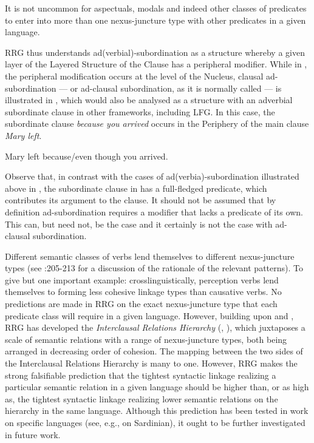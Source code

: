 \documentclass[output=paper,hidelinks]{langscibook}
\begin{document}
It is not uncommon for aspectuals, modals and indeed other classes of predicates to enter into more than one nexus-juncture type with other predicates in a given language.

\hspace*{-3pt}RRG thus understands ad(verbial)-subordination as a structure whereby a given layer of the Layered Structure of the Clause has a peripheral modifier. While in , the peripheral modification occurs at the level of the Nucleus, clausal ad-subordination --- or ad-clausal subordination, as it is normally called --- is illustrated in , which would also be analysed as a structure with an adverbial subordinate clause in other frameworks, including LFG. In this case, the subordinate clause \textit{because you arrived} occurs in the Periphery of the main clause \textit{Mary left}.

\ea%
   \label{ex:RRG:43}
   Mary left because/even though you arrived.
   \z

      

  Observe that, in contrast with the cases of ad(verbia)-subordination illustrated above in , the subordinate clause in  has a full-fledged predicate, which contributes its argument to the clause. It should not be assumed that by definition ad-subordination requires a modifier that lacks a predicate of its own. This can, but need not, be the case and it certainly is not the case with ad-clausal subordination.

  Different semantic classes of verbs lend themselves to different nexus-juncture types (see \citealt{VanValin2005}:205-213 for a discussion of the rationale of the relevant patterns). To give but one important example: crosslinguistically, perception verbs lend themselves to forming less cohesive linkage types than causative verbs. No predictions are made in RRG on the exact nexus-juncture type that each predicate class will require in a given language. However, building upon \citet{Silverstein} and \citet{Givon1980}, RRG has developed the \textit{Interclausal Relations Hierarchy} (\citealt[481-483]{VanValin1997}, \citealt[209]{VanValin2005}), which juxtaposes a scale of semantic relations with a range of nexus-juncture types, both being arranged in decreasing order of cohesion. The mapping between the two sides of the Interclausal Relations Hierarchy is many to one. However, RRG makes the strong falsifiable prediction that the tightest syntactic linkage realizing a particular semantic relation in a given language should be higher than, or as high as, the tightest syntactic linkage realizing lower semantic relations on the hierarchy in the same language. Although this prediction has been tested in work on specific languages (see, e.g., \citealt{Casti2012} on Sardinian), it ought to be further investigated in future work.
\end{document}
